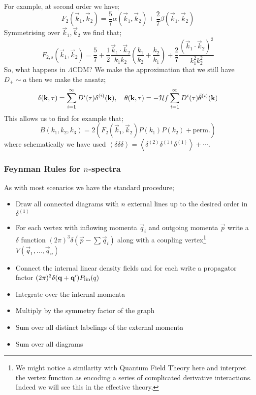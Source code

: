 For example, at second order we have;
\begin{equation*}
F_2(\vec{k}_1, \vec{k}_2) = \frac{5}{7}\alpha(\vec{k}_1, \vec{k}_2) + \frac{2}{7}\beta(\vec{k}_1, \vec{k}_2)
\end{equation*}
Symmetrising over $\vec{k}_1, \vec{k}_2$ we find that;
\begin{equation*}
F_{2,s}(\vec{k}_1, \vec{k}_2) = \frac{5}{7} + \frac{1}{2}\frac{\vec{k}_1\cdot\vec{k}_2}{k_1 k_2}\left(\frac{k_1}{k_2} + \frac{k_2}{k_1}\right) + \frac{2}{7}\frac{(\vec{k}_1 \cdot\vec{k}_2)^2}{k_1^2 k_2^2}
\end{equation*}
So, what happens in $\Lambda$CDM? We make the approximation that we still have $D_+ \sim a$ then we make the ansatz;
\begin{equation}
\delta(\mathbf{k}, \tau) = \sum_{i = 1}^{\infty}{D^i(\tau)\delta^{(i)}(\mathbf{k})}, \quad \theta(\mathbf{k}, \tau) = -\mathcal{H} f\sum_{i = 1}^{\infty}{D^i(\tau) \tilde{\theta}^{(i)}(\mathbf{k})}
\end{equation}
This allows us to find for example that;
\begin{equation*}
B(k_1, k_2, k_3) = 2\left(F_2(\vec{k}_1, \vec{k}_2)P(k_1)P(k_2) + \text{perm.}\right)
\end{equation*}
where schematically we have used $\left< \delta \delta \delta \right> = \left< \delta^{(2)}\delta^{(1)} \delta^{(1)} \right> + \cdots$.
\subsubsection{Feynman Rules for $n$-spectra}
As with most scenarios we have the standard procedure;
\begin{itemize}
\item Draw all connected diagrams with $n$ external lines up to the desired order in $\delta^{(1)}$
\item For each vertex with inflowing momenta $\vec{q}_i$ and outgoing momenta $\vec{p}$ write a $\delta$ function $(2\pi)^3\delta(\vec{p} - \sum \vec{q}_i)$ along with a coupling vertex\footnote{We might notice a similarity with Quantum Field Theory here and interpret the vertex function as encoding a series of complicated derivative interactions. Indeed we will see this in the effective theory.} $V(\vec{q}_1, \ldots, \vec{q}_n)$
\item Connect the internal linear density fields and for each write a propagator factor $(2\pi)^3 \delta(\mathbf{q} + \mathbf{q}^{\prime})P_{\text{lin}}(q)$
\item Integrate over the internal momenta
\item Multiply by the symmetry factor of the graph
\item Sum over all distinct labelings of the external momenta
\item Sum over all diagrams
\end{itemize}
